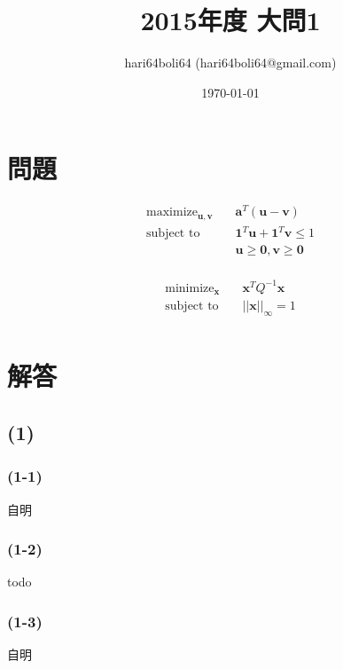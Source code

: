 \documentclass[a4paper, 10pt, dvipdfmx]{jlreq}
\begin{document}
\title{2015年度 大問1}
\author{hari64boli64 (hari64boli64@gmail.com)}
\date{\today}
\maketitle

\section{問題}

\begin{align*}
  \text{maximize}_{\bm{u},\bm{v}} \quad & \bm{a}^T(\bm{u}-\bm{v})              \\
  \text{subject to} \quad               & \bm{1}^T\bm{u}+\bm{1}^T\bm{v} \leq 1 \\
                                        & \bm{u}\geq \bm{0},\bm{v}\geq \bm{0}  \\
\end{align*}


\begin{align*}
  \text{minimize}_{\bm{x}} \quad & \bm{x}^TQ^{-1}\bm{x}    \\
  \text{subject to} \quad        & ||\bm{x}||_{\infty} = 1 \\
\end{align*}

\section{解答}

\subsection*{(1)}

\subsubsection*{(1-1)}

自明

\subsubsection*{(1-2)}

todo

\subsubsection*{(1-3)}

自明
\end{document}
